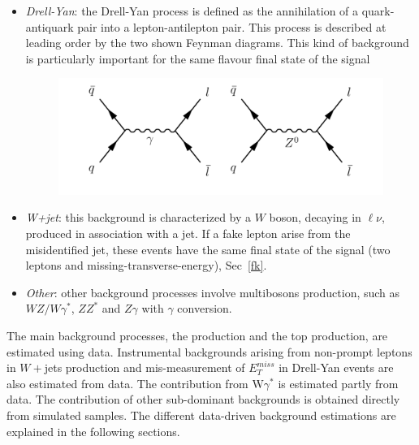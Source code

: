 \begin{itemize}
\begin{figure}[h]
\end{figure}
\item \textit{Drell-Yan}: the Drell-Yan process is defined as the annihilation of a quark-antiquark pair into a lepton-antilepton pair. This process is described at leading order by
the two  shown Feynman diagrams. %
This kind of background is particularly important for the same flavour final state of the signal
\begin{figure}[h]
\centering
\vspace{0.5cm}
\includegraphics[scale= 0.7]{../Cap5/dy}
\end{figure}

\item \textit{W+jet}: this background is characterized by a $W$ boson, decaying in $\ell \nu$, produced in association with a jet. If a fake lepton arise from the misidentified jet, these events have  the same final state of the signal (two leptons and missing-transverse-energy), Sec~\ref{fk}. 

\item \textit{Other}: other background processes involve multibosons production, such as $WZ/W\gamma^*$, $ZZ^*$ and $Z\gamma$ with $\gamma$ conversion.

\end{itemize}
The main background processes, the \WW production and the top production, are estimated using data. 
Instrumental backgrounds arising from non-prompt leptons in $W+$jets production and mis-measurement of $E_T^{miss}$ in Drell-Yan events are also estimated from
data. The contribution from W$\gamma^*$  is estimated partly from data. The
contribution of other sub-dominant backgrounds is obtained directly from simulated samples. The different data-driven background estimations are explained in the following sections. 


